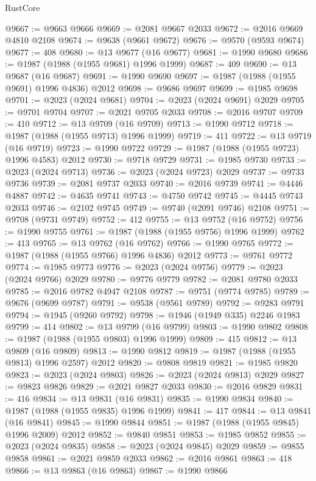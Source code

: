 \begin{lexlean}{RustCore}
\begin{coremodule}
@9667 := @9663 @9666
@9669 := @2081 @9667 @2033
@9672 := @2016 @9669 @4810 @2108
@9674 := @9638 (@9661 @9672)
@9676 := @9570 (@9593 @9674)
@9677 := 408
@9680 := @13 @9677 (@16 @9677)
@9681 := @1990 @9680
@9686 := @1987 (@1988 (@1955 @9681) @1996 @1999)
@9687 := 409
@9690 := @13 @9687 (@16 @9687)
@9691 := @1990 @9690
@9697 := @1987 (@1988 (@1955 @9691) @1996 @4836) @2012
@9698 := @9686 @9697
@9699 := @1985 @9698
@9701 := @2023 (@2024 @9681)
@9704 := @2023 (@2024 @9691) @2029
@9705 := @9701 @9704
@9707 := @2021 @9705 @2033
@9708 := @2016 @9707
@9709 := 410
@9712 := @13 @9709 (@16 @9709)
@9713 := @1990 @9712
@9718 := @1987 (@1988 (@1955 @9713) @1996 @1999)
@9719 := 411
@9722 := @13 @9719 (@16 @9719)
@9723 := @1990 @9722
@9729 := @1987 (@1988 (@1955 @9723) @1996 @4583) @2012
@9730 := @9718 @9729
@9731 := @1985 @9730
@9733 := @2023 (@2024 @9713)
@9736 := @2023 (@2024 @9723) @2029
@9737 := @9733 @9736
@9739 := @2081 @9737 @2033
@9740 := @2016 @9739
@9741 := @4446 @4887
@9742 := @4635 @9741
@9743 := @4750 @9742
@9745 := @4445 @9743 @2033
@9746 := @2102 @9745
@9749 := @9740 (@2091 @9746) @2108
@9751 := @9708 (@9731 @9749)
@9752 := 412
@9755 := @13 @9752 (@16 @9752)
@9756 := @1990 @9755
@9761 := @1987 (@1988 (@1955 @9756) @1996 @1999)
@9762 := 413
@9765 := @13 @9762 (@16 @9762)
@9766 := @1990 @9765
@9772 := @1987 (@1988 (@1955 @9766) @1996 @4836) @2012
@9773 := @9761 @9772
@9774 := @1985 @9773
@9776 := @2023 (@2024 @9756)
@9779 := @2023 (@2024 @9766) @2029
@9780 := @9776 @9779
@9782 := @2081 @9780 @2033
@9785 := @2016 @9782 @4947 @2108
@9787 := @9751 (@9774 @9785)
@9789 := @9676 (@9699 @9787)
@9791 := @9538 (@9561 @9789)
@9792 := @9283 @9791
@9794 := @1945 (@9260 @9792)
@9798 := @1946 (@1949 @335) @2246 @1983
@9799 := 414
@9802 := @13 @9799 (@16 @9799)
@9803 := @1990 @9802
@9808 := @1987 (@1988 (@1955 @9803) @1996 @1999)
@9809 := 415
@9812 := @13 @9809 (@16 @9809)
@9813 := @1990 @9812
@9819 := @1987 (@1988 (@1955 @9813) @1996 @2597) @2012
@9820 := @9808 @9819
@9821 := @1985 @9820
@9823 := @2023 (@2024 @9803)
@9826 := @2023 (@2024 @9813) @2029
@9827 := @9823 @9826
@9829 := @2021 @9827 @2033
@9830 := @2016 @9829
@9831 := 416
@9834 := @13 @9831 (@16 @9831)
@9835 := @1990 @9834
@9840 := @1987 (@1988 (@1955 @9835) @1996 @1999)
@9841 := 417
@9844 := @13 @9841 (@16 @9841)
@9845 := @1990 @9844
@9851 := @1987 (@1988 (@1955 @9845) @1996 @2009) @2012
@9852 := @9840 @9851
@9853 := @1985 @9852
@9855 := @2023 (@2024 @9835)
@9858 := @2023 (@2024 @9845) @2029
@9859 := @9855 @9858
@9861 := @2021 @9859 @2033
@9862 := @2016 @9861
@9863 := 418
@9866 := @13 @9863 (@16 @9863)
@9867 := @1990 @9866

\end{coremodule}
\end{lexlean}
